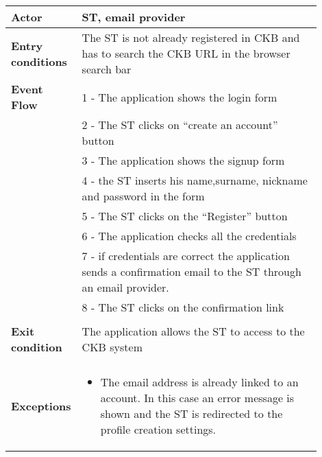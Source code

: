 \begin{center}
    \begin{longtable}{|l|p{0.9\linewidth}|}
        \hline
        \textbf{Actor}            & ST, email provider                                                                                                                                                                                      \\
        \hline
        \textbf{Entry conditions} & The ST is not already registered in CKB and has to search the CKB URL in the browser search bar                                                                                                                   \\
        \hline
        \textbf{Event Flow}       & 1 - The application shows the login form  \\
        & 2 - The ST clicks on “create an account” button  \\
        & 3 - The application shows the signup form  \\
        & 4 - the ST inserts his name,surname, nickname and password in the form  \\
        & 5 - The ST clicks on the “Register” button  \\
        & 6 - The application checks all the credentials  \\
        & 7 - if credentials are correct the application sends a confirmation email to the ST through an email provider.  \\
        & 8 - The ST clicks on the confirmation link                                                                        \\                                                                                                                                                                    \\
        \hline
        \textbf{Exit condition}   & The application allows the ST to access to the CKB system \\                                                                                                                                                                                \\
        \hline
        \textbf{Exceptions}       & \begin{itemize}
            \item The email address is already linked to an account. In this case an error message is shown and the ST is redirected to the profile creation settings.

\end{itemize}
\end{longtable}
\end{center}

